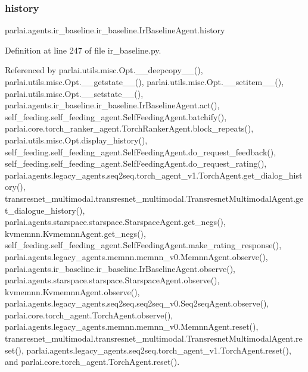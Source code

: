 \mbox{\label{classparlai_1_1agents_1_1ir__baseline_1_1ir__baseline_1_1IrBaselineAgent_a8644e518e11536f13338eafcda213d0c}} 
\subsubsection{\texorpdfstring{history}{history}}
{\footnotesize\ttfamily parlai.\+agents.\+ir\+\_\+baseline.\+ir\+\_\+baseline.\+Ir\+Baseline\+Agent.\+history}



Definition at line 247 of file ir\+\_\+baseline.\+py.



Referenced by parlai.\+utils.\+misc.\+Opt.\+\_\+\+\_\+deepcopy\+\_\+\+\_\+(), parlai.\+utils.\+misc.\+Opt.\+\_\+\+\_\+getstate\+\_\+\+\_\+(), parlai.\+utils.\+misc.\+Opt.\+\_\+\+\_\+setitem\+\_\+\+\_\+(), parlai.\+utils.\+misc.\+Opt.\+\_\+\+\_\+setstate\+\_\+\+\_\+(), parlai.\+agents.\+ir\+\_\+baseline.\+ir\+\_\+baseline.\+Ir\+Baseline\+Agent.\+act(), self\+\_\+feeding.\+self\+\_\+feeding\+\_\+agent.\+Self\+Feeding\+Agent.\+batchify(), parlai.\+core.\+torch\+\_\+ranker\+\_\+agent.\+Torch\+Ranker\+Agent.\+block\+\_\+repeats(), parlai.\+utils.\+misc.\+Opt.\+display\+\_\+history(), self\+\_\+feeding.\+self\+\_\+feeding\+\_\+agent.\+Self\+Feeding\+Agent.\+do\+\_\+request\+\_\+feedback(), self\+\_\+feeding.\+self\+\_\+feeding\+\_\+agent.\+Self\+Feeding\+Agent.\+do\+\_\+request\+\_\+rating(), parlai.\+agents.\+legacy\+\_\+agents.\+seq2seq.\+torch\+\_\+agent\+\_\+v1.\+Torch\+Agent.\+get\+\_\+dialog\+\_\+history(), transresnet\+\_\+multimodal.\+transresnet\+\_\+multimodal.\+Transresnet\+Multimodal\+Agent.\+get\+\_\+dialogue\+\_\+history(), parlai.\+agents.\+starspace.\+starspace.\+Starspace\+Agent.\+get\+\_\+negs(), kvmemnn.\+Kvmemnn\+Agent.\+get\+\_\+negs(), self\+\_\+feeding.\+self\+\_\+feeding\+\_\+agent.\+Self\+Feeding\+Agent.\+make\+\_\+rating\+\_\+response(), parlai.\+agents.\+legacy\+\_\+agents.\+memnn.\+memnn\+\_\+v0.\+Memnn\+Agent.\+observe(), parlai.\+agents.\+ir\+\_\+baseline.\+ir\+\_\+baseline.\+Ir\+Baseline\+Agent.\+observe(), parlai.\+agents.\+starspace.\+starspace.\+Starspace\+Agent.\+observe(), kvmemnn.\+Kvmemnn\+Agent.\+observe(), parlai.\+agents.\+legacy\+\_\+agents.\+seq2seq.\+seq2seq\+\_\+v0.\+Seq2seq\+Agent.\+observe(), parlai.\+core.\+torch\+\_\+agent.\+Torch\+Agent.\+observe(), parlai.\+agents.\+legacy\+\_\+agents.\+memnn.\+memnn\+\_\+v0.\+Memnn\+Agent.\+reset(), transresnet\+\_\+multimodal.\+transresnet\+\_\+multimodal.\+Transresnet\+Multimodal\+Agent.\+reset(), parlai.\+agents.\+legacy\+\_\+agents.\+seq2seq.\+torch\+\_\+agent\+\_\+v1.\+Torch\+Agent.\+reset(), and parlai.\+core.\+torch\+\_\+agent.\+Torch\+Agent.\+reset().

